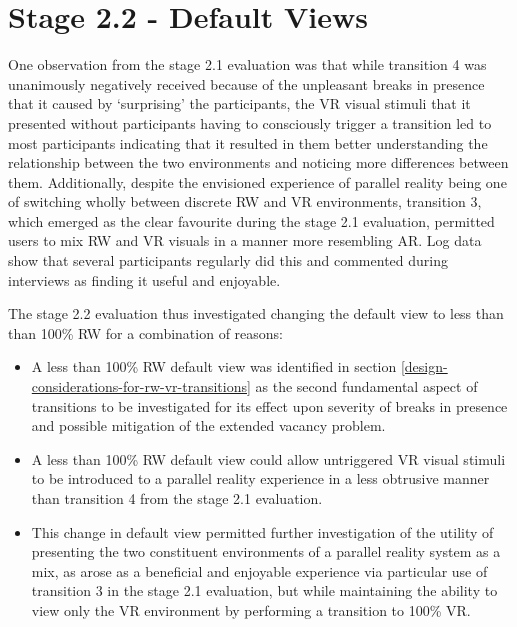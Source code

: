 


\section{Stage 2.2 - Default Views}

One observation from the stage 2.1 evaluation was that while transition 4 was unanimously negatively received because of the unpleasant breaks in presence that it caused by `surprising' the participants, the VR visual stimuli that it presented without participants having to consciously trigger a transition led to most participants indicating that it resulted in them better understanding the relationship between the two environments and noticing more differences between them. Additionally, despite the envisioned experience of parallel reality being one of switching wholly between discrete RW and VR environments, transition 3, which emerged as the clear favourite during the stage 2.1 evaluation, permitted users to mix RW and VR visuals in a manner more resembling AR. Log data show that several participants regularly did this and commented during interviews as finding it useful and enjoyable.

The stage 2.2 evaluation thus investigated changing the default view to less than than 100\% RW for a combination of reasons:

\begin{itemize}
	\item A less than 100\% RW default view was identified in section \ref{design-considerations-for-rw-vr-transitions} as the second fundamental aspect of transitions to be investigated for its effect upon severity of breaks in presence and possible mitigation of the extended vacancy problem.
	\item A less than 100\% RW default view could allow untriggered VR visual stimuli to be introduced to a parallel reality experience in a less obtrusive manner than transition 4 from the stage 2.1 evaluation.
	\item This change in default view permitted further investigation of the utility of presenting the two constituent environments of a parallel reality system as a mix, as arose as a beneficial and enjoyable experience via particular use of transition 3 in the stage 2.1 evaluation, but while maintaining the ability to view only the VR environment by performing a transition to 100\% VR.
\end{itemize}

